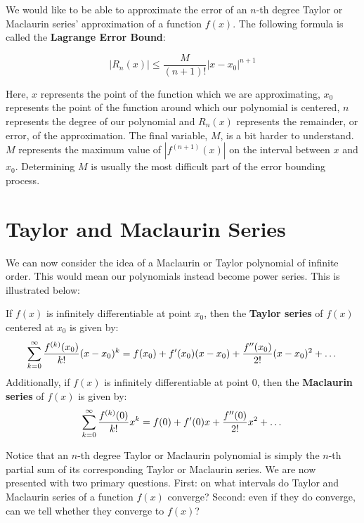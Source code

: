 \documentclass[11pt]{article}
\begin{document}

We would like to be able to approximate the error of an $n$-th degree Taylor or Maclaurin series' approximation of a function $f(x)$. The following formula is called the \textbf{Lagrange Error Bound}:

\[ |R_n(x)| \leq \frac{M}{(n+1)!}|x-x_0|^{n+1}\]

Here, $x$ represents the point of the function which we are approximating, $x_0$ represents the point of the function around which our polynomial is centered, $n$ represents the degree of our polynomial and $R_n(x)$ represents the remainder, or error, of the approximation. The final variable, $M$, is a bit harder to understand. $M$ represents the maximum value of $|f^{(n+1)}(x)|$ on the interval between $x$ and $x_0$. Determining $M$ is usually the most difficult part of the error bounding process.

\section{Taylor and Maclaurin Series}
We can now consider the idea of a Maclaurin or Taylor polynomial of infinite order. This would mean our polynomials instead become power series. This is illustrated below:\\

\begin{center}
    If $f(x)$ is infinitely differentiable at point $x_0$, then the \textbf{Taylor series} of $f(x)$ centered at $x_0$ is given by:
    \[\sum_{k=0}^{\infty} \frac{f^{(k)}(x_0)}{k!}(x-x_0)^k=f(x_0)+f'(x_0)(x-x_0)+\frac{f''(x_0)}{2!}(x-x_0)^2 +\text{\dots}\]
    Additionally, if $f(x)$ is infinitely differentiable at point $0$, then the \textbf{Maclaurin series} of $f(x)$ is given by:
    \[\sum_{k=0}^{\infty} \frac{f^{(k)}(0)}{k!}x^k=f(0)+f'(0)x+\frac{f''(0)}{2!}x^2 +\text{\dots}\]
\end{center}

Notice that an $n$-th degree Taylor or Maclaurin polynomial is simply the $n$-th partial sum of its corresponding Taylor or Maclaurin series. We are now presented with two primary questions. First: on what intervals do Taylor and Maclaurin series of a function $f(x)$ converge? Second: even if they do converge, can we tell whether they converge to $f(x)$? 
\end{document}
